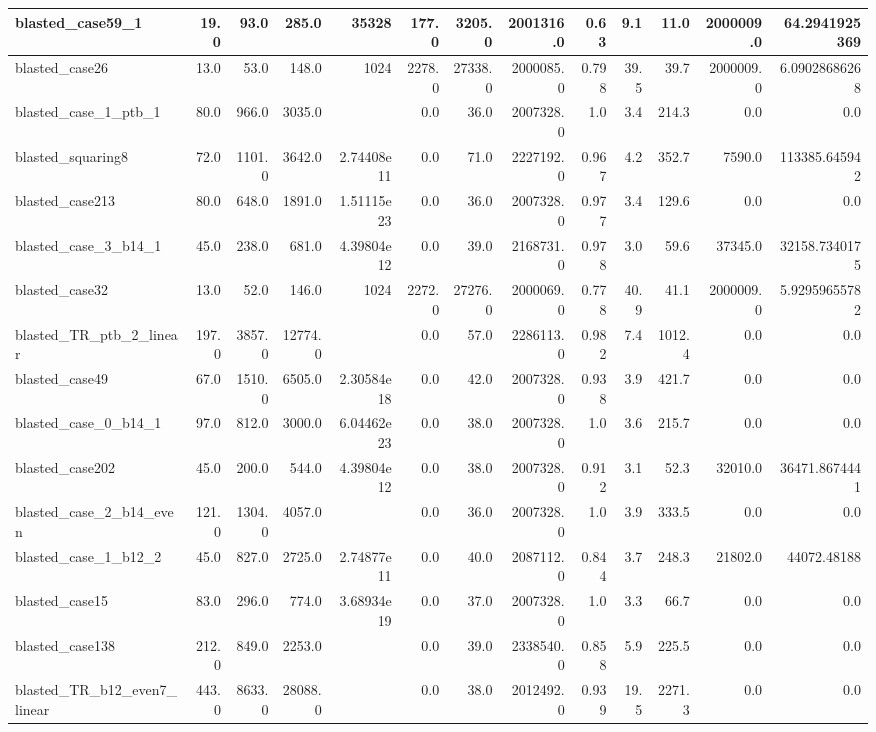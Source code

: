 \begin{tabular}{|l r r r r| r r r r r r | r r|}
\hline
blasted\_case59\_1 & 19.0 & 93.0 & 285.0 & 35328 & 177.0 & 3205.0 & 2001316.0 & 0.63 & 9.1 & 11.0 & 2000009.0 & 64.2941925369 \\
\hline
blasted\_case26 & 13.0 & 53.0 & 148.0 & 1024 & 2278.0 & 27338.0 & 2000085.0 & 0.798 & 39.5 & 39.7 & 2000009.0 & 6.09028686268 \\
\hline
blasted\_case\_1\_ptb\_1 & 80.0 & 966.0 & 3035.0 &  & 0.0 & 36.0 & 2007328.0 & 1.0 & 3.4 & 214.3 & 0.0 & 0.0 \\
\hline
blasted\_squaring8 & 72.0 & 1101.0 & 3642.0 & 2.74408e11 & 0.0 & 71.0 & 2227192.0 & 0.967 & 4.2 & 352.7 & 7590.0 & 113385.645942 \\
\hline
blasted\_case213 & 80.0 & 648.0 & 1891.0 & 1.51115e23 & 0.0 & 36.0 & 2007328.0 & 0.977 & 3.4 & 129.6 & 0.0 & 0.0 \\
\hline
blasted\_case\_3\_b14\_1 & 45.0 & 238.0 & 681.0 & 4.39804e12 & 0.0 & 39.0 & 2168731.0 & 0.978 & 3.0 & 59.6 & 37345.0 & 32158.7340175 \\
\hline
blasted\_case32 & 13.0 & 52.0 & 146.0 & 1024 & 2272.0 & 27276.0 & 2000069.0 & 0.778 & 40.9 & 41.1 & 2000009.0 & 5.92959655782 \\
\hline
blasted\_TR\_ptb\_2\_linear & 197.0 & 3857.0 & 12774.0 &  & 0.0 & 57.0 & 2286113.0 & 0.982 & 7.4 & 1012.4 & 0.0 & 0.0 \\
\hline
blasted\_case49 & 67.0 & 1510.0 & 6505.0 & 2.30584e18 & 0.0 & 42.0 & 2007328.0 & 0.938 & 3.9 & 421.7 & 0.0 & 0.0 \\
\hline
blasted\_case\_0\_b14\_1 & 97.0 & 812.0 & 3000.0 & 6.04462e23 & 0.0 & 38.0 & 2007328.0 & 1.0 & 3.6 & 215.7 & 0.0 & 0.0 \\
\hline
blasted\_case202 & 45.0 & 200.0 & 544.0 & 4.39804e12 & 0.0 & 38.0 & 2007328.0 & 0.912 & 3.1 & 52.3 & 32010.0 & 36471.8674441 \\
\hline
blasted\_case\_2\_b14\_even & 121.0 & 1304.0 & 4057.0 &  & 0.0 & 36.0 & 2007328.0 & 1.0 & 3.9 & 333.5 & 0.0 & 0.0 \\
\hline
blasted\_case\_1\_b12\_2 & 45.0 & 827.0 & 2725.0 & 2.74877e11 & 0.0 & 40.0 & 2087112.0 & 0.844 & 3.7 & 248.3 & 21802.0 & 44072.48188 \\
\hline
blasted\_case15 & 83.0 & 296.0 & 774.0 & 3.68934e19 & 0.0 & 37.0 & 2007328.0 & 1.0 & 3.3 & 66.7 & 0.0 & 0.0 \\
\hline
blasted\_case138 & 212.0 & 849.0 & 2253.0 &  & 0.0 & 39.0 & 2338540.0 & 0.858 & 5.9 & 225.5 & 0.0 & 0.0 \\
\hline
blasted\_TR\_b12\_even7\_linear & 443.0 & 8633.0 & 28088.0 &  & 0.0 & 38.0 & 2012492.0 & 0.939 & 19.5 & 2271.3 & 0.0 & 0.0 \\

\end{tabular}
